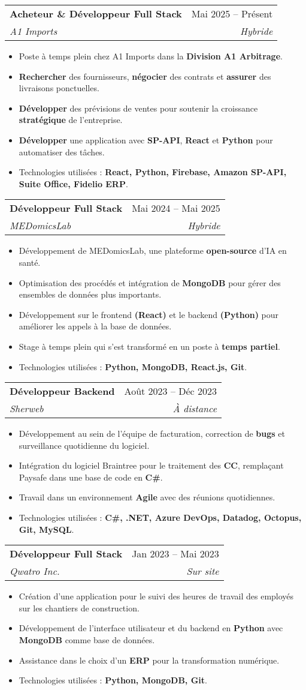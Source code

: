 \documentclass[letterpaper,11pt]{article}
\makeatletter
\newcommand{\resumeItem}[1]{
  \item\small{
    {#1 \vspace{-2pt}}
  }
}
\newcommand{\resumeSubheading}[4]{
  \vspace{-2pt}\item
    \begin{tabular*}{0.97\textwidth}[t]{l@{\extracolsep{\fill}}r}
      \textbf{#1} & #2 \\
      \textit{\small#3} & \textit{\small #4} \\
    \end{tabular*}\vspace{-7pt}
}
\newcommand{\resumeItemListStart}{\begin{itemize}}
\newcommand{\resumeItemListEnd}{\end{itemize}\vspace{-5pt}}
\makeatother
\begin{document}
    \resumeSubheading
      {Acheteur \& Développeur Full Stack}{Mai 2025 -- Présent}
      {A1 Imports}{Hybride}
      \resumeItemListStart
        \resumeItem{Poste à temps plein chez A1 Imports dans la \textbf{Division A1 Arbitrage}.}
        \resumeItem{\textbf{Rechercher} des fournisseurs, \textbf{négocier} des contrats et \textbf{assurer} des livraisons ponctuelles.}
        \resumeItem{\textbf{Développer} des prévisions de ventes pour soutenir la croissance \textbf{stratégique} de l'entreprise.}
        \resumeItem{\textbf{Développer} une application avec \textbf{SP-API}, \textbf{React} et \textbf{Python} pour automatiser des tâches.}
        \resumeItem{Technologies utilisées : \textbf{React, Python, Firebase, Amazon SP-API, Suite Office, Fidelio ERP}.}
      \resumeItemListEnd

    \resumeSubheading
      {Développeur Full Stack}{Mai 2024 -- Mai 2025}
      {MEDomicsLab}{Hybride}
      \resumeItemListStart
        \resumeItem{Développement de MEDomicsLab, une plateforme \textbf{open-source} d'IA en santé.}
        \resumeItem{Optimisation des procédés et intégration de \textbf{MongoDB} pour gérer des ensembles de données plus importants.}
        \resumeItem{Développement sur le frontend \textbf{(React)} et le backend \textbf{(Python)} pour améliorer les appels à la base de données.}
        \resumeItem{Stage à temps plein qui s'est transformé en un poste à \textbf{temps partiel}.}
        \resumeItem{Technologies utilisées : \textbf{Python, MongoDB, React.js, Git}.}
      \resumeItemListEnd

    \resumeSubheading
      {Développeur Backend}{Août 2023 -- Déc 2023}
      {Sherweb}{À distance}
      \resumeItemListStart
        \resumeItem{Développement au sein de l'équipe de facturation, correction de \textbf{bugs} et surveillance quotidienne du logiciel.}
        \resumeItem{Intégration du logiciel Braintree pour le traitement des \textbf{CC}, remplaçant Paysafe dans une base de code en \textbf{C\#}.}
        \resumeItem{Travail dans un environnement \textbf{Agile} avec des réunions quotidiennes.}
        \resumeItem{Technologies utilisées : \textbf{C\#, .NET, Azure DevOps, Datadog, Octopus, Git, MySQL}.}
      \resumeItemListEnd

    \resumeSubheading
      {Développeur Full Stack}{Jan 2023 -- Mai 2023}
      {Qwatro Inc.}{Sur site}
      \resumeItemListStart
        \resumeItem{Création d'une application pour le suivi des heures de travail des employés sur les chantiers de construction.}
        \resumeItem{Développement de l'interface utilisateur et du backend en \textbf{Python} avec \textbf{MongoDB} comme base de données.}
        \resumeItem{Assistance dans le choix d'un \textbf{ERP} pour la transformation numérique.}
        \resumeItem{Technologies utilisées : \textbf{Python, MongoDB, Git}.}
      \resumeItemListEnd
\end{document}
